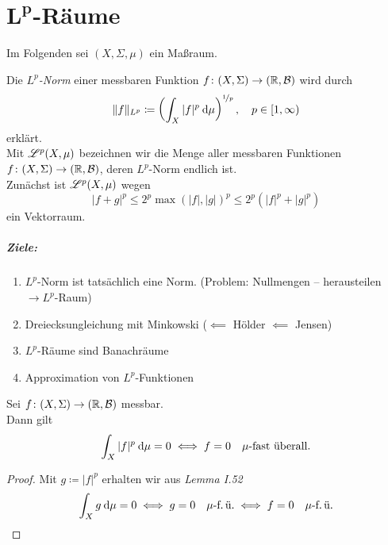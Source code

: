 \documentclass[skript.tex]{subfiles}
\begin{document}
	\chapter{$\boldsymbol{L^p}$-Räume}
	\setcounter{cntr}{0}
		
	\begin{notat*}
		Im Folgenden sei $(X,\Sigma,\mu)$ ein Maßraum.
	\end{notat*}

	\begin{defin}[$L^p$-„Norm“]
		Die \emph{$L^p$-Norm} einer messbaren Funktion $f \colon (X,\Sigma) \to (\mathbb{R},\mathcal{B})$ wird durch
		\[
			\lVert f \rVert_{L^p} \coloneqq \left(
				\int_X |f|^p \: \mathrm{d} \mu
			\right)^{\nicefrac{1}{p}}, \quad p \in [1,\infty)
		\]
		erklärt.
		\medskip\\
		Mit $\mathscr{L}^p(X,\mu)$ bezeichnen wir die Menge aller messbaren Funktionen $f \colon (X,\Sigma) \to (\mathbb{R},\mathcal{B})$, deren $L^p$-Norm endlich ist.\\
		Zunächst ist $\mathscr{L}^p(X,\mu)$ wegen
		\[
			|f+g|^p \leq 2^p \max(|f|,|g|)^p \leq 2^p(|f|^p+|g|^p)
		\]
		ein Vektorraum.
	\end{defin}
	\paragraph{Ziele:}
	\begin{enumerate}[(1)]
		\item $L^p$-Norm ist tatsächlich eine Norm. (Problem: Nullmengen -- herausteilen $\rightarrow L^p$-Raum)
		\item Dreiecksungleichung mit Minkowski ($\impliedby$ Hölder $\impliedby$ Jensen)
		\item $L^p$-Räume sind Banachräume
		\item Approximation von $L^p$-Funktionen
	\end{enumerate}

	\begin{lem}
		Sei $f \colon (X,\Sigma) \to (\mathbb{R},\mathcal{B})$ messbar.\\
		Dann gilt
		\[
			\int_X |f|^p \: \mathrm{d} \mu = 0 \iff f=0 \text{\quad$\mu$-fast überall.}
		\]
	\end{lem}
	\begin{proof}
		Mit $g \coloneqq |f|^p$ erhalten wir aus \emph{Lemma I.52}
		\[
			\int_X g \: \mathrm{d}\mu = 0 \iff g=0 \text{\quad$\mu$-f.\,ü.} \iff f=0 \text{\quad$\mu$-f.\,ü.}
		\]
	\end{proof}
\end{document}
